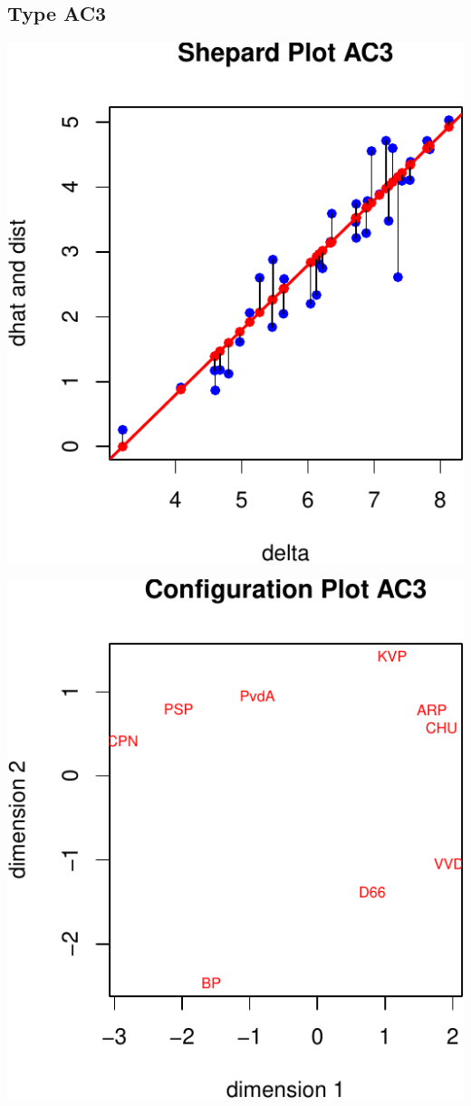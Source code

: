 \documentclass[
  12pt,
]{article}
\begin{document}
\subsection{Type AC3}\label{type-ac3}

\begin{center}\includegraphics{smacofAC_files/figure-latex/gruijterh10-1} \end{center}

\begin{center}\includegraphics{smacofAC_files/figure-latex/gruijterh10-2} \end{center}
\end{document}

